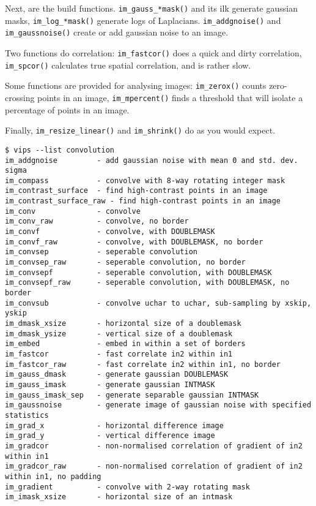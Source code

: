 Next, are the build functions. \verb+im_gauss_*mask()+ and its ilk
generate gaussian masks, \verb+im_log_*mask()+ generate logs of Laplacians.
\verb+im_addgnoise()+ and \verb+im_gaussnoise()+ create or add gaussian
noise to an image.

Two functions do correlation: \verb+im_fastcor()+ does a quick and dirty
correlation, \verb+im_spcor()+ calculates true spatial correlation, and is
rather slow.

Some functions are provided for analysing images: \verb+im_zerox()+ counts
zero-crossing points in an image, \verb+im_mpercent()+ finds a threshold
that will isolate a percentage of points in an image.

Finally, \verb+im_resize_linear()+ and \verb+im_shrink()+ do as you would
expect.

\begin{fig2}
\begin{verbatim}
$ vips --list convolution
im_addgnoise         - add gaussian noise with mean 0 and std. dev. sigma
im_compass           - convolve with 8-way rotating integer mask
im_contrast_surface  - find high-contrast points in an image
im_contrast_surface_raw - find high-contrast points in an image
im_conv              - convolve
im_conv_raw          - convolve, no border
im_convf             - convolve, with DOUBLEMASK
im_convf_raw         - convolve, with DOUBLEMASK, no border
im_convsep           - seperable convolution
im_convsep_raw       - seperable convolution, no border
im_convsepf          - seperable convolution, with DOUBLEMASK
im_convsepf_raw      - seperable convolution, with DOUBLEMASK, no border
im_convsub           - convolve uchar to uchar, sub-sampling by xskip, yskip
im_dmask_xsize       - horizontal size of a doublemask
im_dmask_ysize       - vertical size of a doublemask
im_embed             - embed in within a set of borders
im_fastcor           - fast correlate in2 within in1
im_fastcor_raw       - fast correlate in2 within in1, no border
im_gauss_dmask       - generate gaussian DOUBLEMASK
im_gauss_imask       - generate gaussian INTMASK
im_gauss_imask_sep   - generate separable gaussian INTMASK
im_gaussnoise        - generate image of gaussian noise with specified statistics
im_grad_x            - horizontal difference image
im_grad_y            - vertical difference image
im_gradcor           - non-normalised correlation of gradient of in2 within in1
im_gradcor_raw       - non-normalised correlation of gradient of in2 within in1, no padding
im_gradient          - convolve with 2-way rotating mask
im_imask_xsize       - horizontal size of an intmask

\end{verbatim}
\end{fig2}
